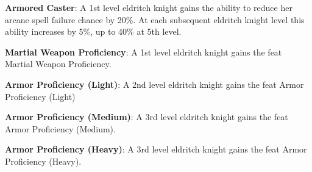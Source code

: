 \textbf{Armored Caster}: A 1st level eldritch knight gains the ability to reduce her arcane spell failure chance by 20\%. At each subsequent eldritch knight level this ability increases by 5\%, up to 40\% at 5th level.

\textbf{Martial Weapon Proficiency}: A 1st level eldritch knight gains the feat Martial Weapon Proficiency.

\textbf{Armor Proficiency (Light)}: A 2nd level eldritch knight gains the feat Armor Proficiency (Light)

\textbf{Armor Proficiency (Medium)}: A 3rd level eldritch knight gains the feat Armor Proficiency (Medium).

\textbf{Armor Proficiency (Heavy)}: A 3rd level eldritch knight gains the feat Armor Proficiency (Heavy).